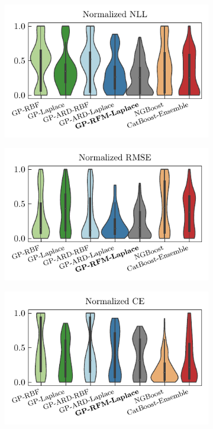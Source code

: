 \begin{figure}[htb]
    \centering
    \begin{subfigure}[b]{0.475\textwidth}
        \centering
        \includegraphics[trim=0 40 0 0, clip, width=\textwidth]{figures/uci_nll.pdf}
    \end{subfigure}
    \hfill
    \begin{subfigure}[b]{0.475\textwidth}  
        \centering 
        \includegraphics[trim=0 40 0 0, clip, width=\textwidth]{figures/uci_rmse.pdf}
    \end{subfigure}
    \begin{subfigure}[b]{0.475\textwidth}   
        \centering 
        \includegraphics[width=\textwidth]{figures/uci_coverage.pdf}

\end{subfigure}
\end{figure}
